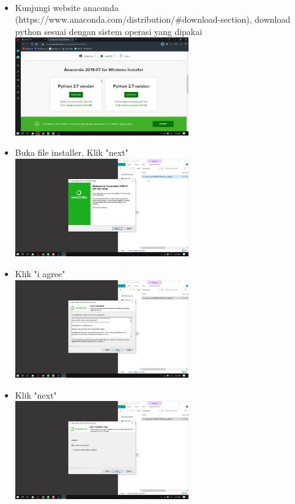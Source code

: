 \documentclass[a4paper,12pt]{report}
\begin{document}
\paragraph{}
\begin{itemize}
	\item Kunjungi website anaconda (https://www.anaconda.com/distribution/\#download-section), download python sesuai dengan sistem operasi yang dipakai\\
	\includegraphics[width=7.5cm]{gambar/anaconda/anaconda1.png} 
	\item Buka file installer, Klik "next"\\
	\includegraphics[width=7.5cm]{gambar/anaconda/Screenshot (60).png} 
	\item Klik "i agree"\\
	\includegraphics[width=7.5cm]{gambar/anaconda/Screenshot (61).png} 
	\item Klik "next"\\
	\includegraphics[width=7.5cm]{gambar/anaconda/Screenshot (62).png} 

\end{itemize}
\end{document}
